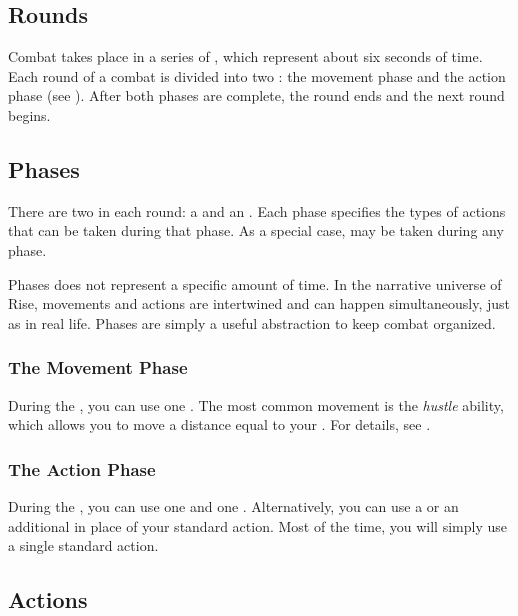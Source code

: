   \subsection{Rounds}\label{Rounds}

    Combat takes place in a series of , which represent about six seconds of time.
    Each round of a combat is divided into two : the movement phase and the action phase (see ).
    After both phases are complete, the round ends and the next round begins.

  \subsection{Phases}\label{Phases}

    There are two  in each round: a  and an .
    Each phase specifies the types of actions that can be taken during that phase.
    As a special case,  may be taken during any phase.

    Phases does not represent a specific amount of time.
    In the narrative universe of Rise, movements and actions are intertwined and can happen simultaneously, just as in real life.
    Phases are simply a useful abstraction to keep combat organized.

    \subsubsection{The Movement Phase}\label{The Movement Phase}
      During the , you can use one .
      The most common movement is the \textit{hustle} ability, which allows you to move a distance equal to your .
      For details, see .

    \subsubsection{The Action Phase}\label{The Action Phase}
      During the , you can use one  and one .
      Alternatively, you can use a  or an additional  in place of your standard action.
      Most of the time, you will simply use a single standard action.

  \subsection{Actions}\label{Actions}

